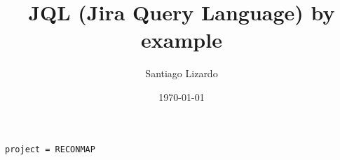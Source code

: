 \documentclass{book}
\title{JQL (Jira Query Language) by example}
\author{Santiago Lizardo}
\date{\today}
\begin{document}
\maketitle

\newpage

\begin{lstlisting}[]
project = RECONMAP
\end{lstlisting}
\end{document}
